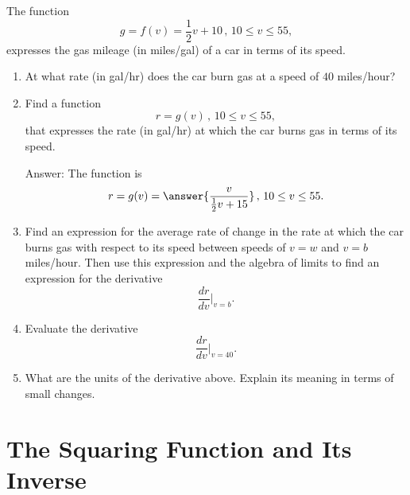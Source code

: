 \documentclass{ximera}
\begin{document}
\begin{question} \label{QOidIdtgt4n}
The function
\[
   g = f(v) = \frac{1}{2}v + 10 \, , \, 10\leq v \leq 55 ,
\]
expresses the gas mileage (in miles/gal) of a car in terms of its speed.

\begin{enumerate}
\item At what rate (in gal/hr) does the car burn gas at a speed of $40$ miles/hour?

\item Find a function
\[
    r =g(v)\, , \, 10\leq v \leq 55 ,
\]
that expresses the rate (in gal/hr) at which the car burns gas in terms of its speed.

Answer: The function is 
\[
     r = g(v) = \answer{\frac{v}{\frac{1}{2}v + 15}} \, , \, 10\leq v \leq 55 .
\]

\item Find an expression for the average rate of change in the rate at which the car burns gas with respect to its speed between speeds of $v=w$ and $v=b$ miles/hour. Then use this expression and the algebra of limits to find an expression for the derivative
\[
   \frac{dr}{dv}\Big|_{v=b} .
\]

\item Evaluate the derivative
\[
   \frac{dr}{dv}\Big|_{v=40} .
\]

\item What are the units of the derivative above. Explain its meaning in terms of small changes.


\end{enumerate}
\end{question}

\section{The Squaring Function and Its Inverse}
\end{document}
